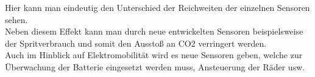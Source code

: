 				Hier kann man eindeutig den Unterschied der Reichweiten der einzelnen Sensoren sehen.\\
				
				Neben diesem Effekt kann man durch neue entwickelten Sensoren beispielsweise der Spritverbrauch und somit den Ausstoß an CO2 verringert werden.\\
				Auch im Hinblick auf Elektromobilität wird es neue Sensoren geben, welche zur Überwachung der Batterie eingesetzt werden muss, Ansteuerung der Räder usw.